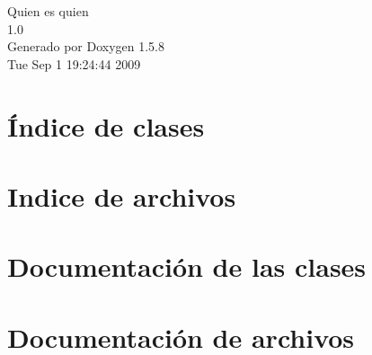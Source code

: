 \documentclass[a4paper]{book}
\begin{document}
\begin{titlepage}
\vspace*{7cm}
\begin{center}
{\Large Quien es quien \\[1ex]\large 1.0 }\\
\vspace*{1cm}
{\large Generado por Doxygen 1.5.8}\\
\vspace*{0.5cm}
{\small Tue Sep 1 19:24:44 2009}\\
\end{center}
\end{titlepage}
\clearemptydoublepage
{}
\tableofcontents
\clearemptydoublepage
{}
\chapter{Índice de clases}

\chapter{Indice de archivos}

\chapter{Documentación de las clases}














\chapter{Documentación de archivos}


































\printindex
\end{document}
